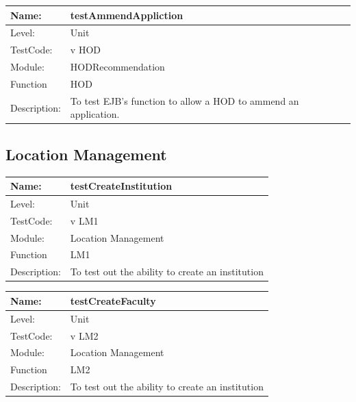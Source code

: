 \documentclass[12pt]{article}
\begin{document}
\begin{flushleft}
\begin{center}
\begin{tabular}{|l|p{12cm}|}
\hline

 Name: & testAmmendAppliction  \\
\hline
Level: & Unit \\
\hline
TestCode: & v HOD \\
\hline
Module:& HODRecommendation \\
\hline
Function & HOD \\
\hline
Description: & To test EJB's function to allow a HOD to ammend an application. \\
\hline
\end{tabular}
\end{center}

\subsection{Location Management}
\begin{center}
\begin{tabular}{|l|p{12cm}|}
\hline

 Name: & testCreateInstitution\\
 \hline
Level: & Unit \\
\hline
TestCode: & v LM1 \\
\hline
Module:& Location Management \\
\hline
Function & LM1 \\
\hline
Description: & To test out the ability to create an institution  \\
\hline
\end{tabular}
\end{center}

\begin{center}
\begin{tabular}{|l|p{12cm}|}
\hline

 Name: & testCreateFaculty\\ 
 \hline
Level: & Unit \\
\hline
TestCode: & v LM2 \\
\hline
Module:& Location Management \\
\hline
Function & LM2 \\
\hline
Description: & To test out the ability to create an institution  \\
\hline
\end{tabular}
\end{center}


\end{flushleft}
\end{document}
